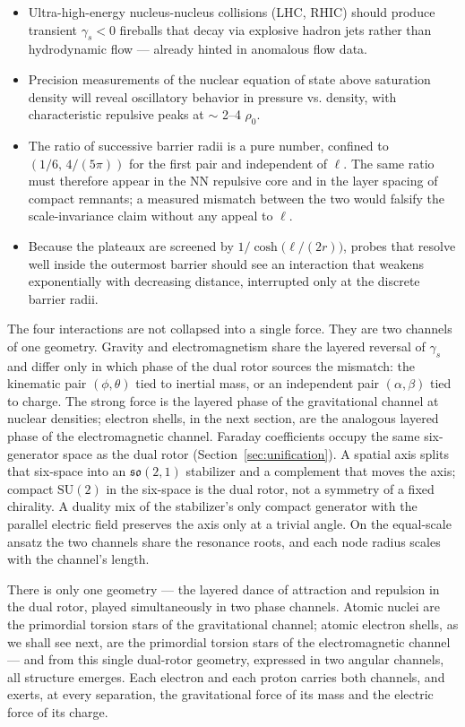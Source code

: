 \documentclass[a4paper]{article}
\begin{document}
\begin{itemize}
\item Ultra-high-energy nucleus-nucleus collisions (LHC, RHIC) should produce transient \(\gamma_s<0\) fireballs that decay via explosive hadron jets rather than hydrodynamic flow — already hinted in anomalous flow data.
\item Precision measurements of the nuclear equation of state above saturation density will reveal oscillatory behavior in pressure vs. density, with characteristic repulsive peaks at $\sim$ 2–4 $\rho_0$.
\item The ratio of successive barrier radii is a pure number, confined to \((1/6,\,4/(5\pi))\) for the first pair and independent of \(\ell\). The same ratio must therefore appear in the NN repulsive core and in the layer spacing of compact remnants; a measured mismatch between the two would falsify the scale-invariance claim without any appeal to \(\ell\).
\item Because the plateaux are screened by \(1/\cosh\bigl(\ell/(2r)\bigr)\), probes that resolve well inside the outermost barrier should see an interaction that weakens exponentially with decreasing distance, interrupted only at the discrete barrier radii.
\end{itemize}

The four interactions are not collapsed into a single force. They are two channels of one geometry. Gravity and electromagnetism share the layered reversal of \(\gamma_s\) and differ only in which phase of the dual rotor sources the mismatch: the kinematic pair $(\phi, \theta)$ tied to inertial mass, or an independent pair $(\alpha, \beta)$ tied to charge. The strong force is the layered phase of the gravitational channel at nuclear densities; electron shells, in the next section, are the analogous layered phase of the electromagnetic channel. Faraday coefficients occupy the same six-generator space as the dual rotor (Section~\ref{sec:unification}). A spatial axis splits that six-space into an $\mathfrak{so}(2,1)$ stabilizer and a complement that moves the axis; compact $\mathrm{SU}(2)$ in the six-space is the dual rotor, not a symmetry of a fixed chirality. A duality mix of the stabilizer's only compact generator with the parallel electric field preserves the axis only at a trivial angle. On the equal-scale ansatz the two channels share the resonance roots, and each node radius scales with the channel's length.

There is only one geometry — the layered dance of attraction and repulsion in the dual rotor, played simultaneously in two phase channels. Atomic nuclei are the primordial torsion stars of the gravitational channel; atomic electron shells, as we shall see next, are the primordial torsion stars of the electromagnetic channel — and from this single dual-rotor geometry, expressed in two angular channels, all structure emerges. Each electron and each proton carries both channels, and exerts, at every separation, the gravitational force of its mass and the electric force of its charge.
\end{document}
